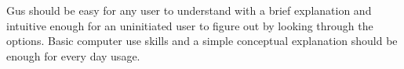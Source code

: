 		Gus should be easy for any user to understand with a brief
		explanation and intuitive enough for an uninitiated user to
		figure out by looking through the options. Basic computer use
		skills and a simple conceptual explanation should be enough for
		every day usage.